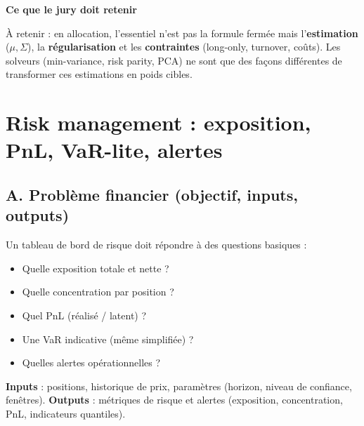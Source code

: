 \documentclass[11pt,a4paper]{report}
\theoremstyle{definition}
\theoremstyle{plain}
\theoremstyle{remark}
\newcommand{\1}{\mathbf{1}}
\newenvironment{jurybox}{
\par\medskip
\begin{lrbox}{\juryboxbox}
\begin{minipage}{0.97\textwidth}
\textbf{Ce que le jury doit retenir}\par\smallskip
\ignorespaces
}{
\unskip\end{minipage}
\end{lrbox}
\noindent\fcolorbox{black!30}{black!3}{\usebox{\juryboxbox}}
\par\medskip
}
\begin{document}

\begin{jurybox}
À retenir : en allocation, l'essentiel n'est pas la formule fermée mais l'\textbf{estimation} ($\mu,\Sigma$), la \textbf{régularisation} et les \textbf{contraintes} (long-only, turnover, coûts). Les solveurs (min-variance, risk parity, PCA) ne sont que des façons différentes de transformer ces estimations en poids cibles.
\end{jurybox}

\chapter{Risk management : exposition, PnL, VaR-lite, alertes}

\section{A. Problème financier (objectif, inputs, outputs)}
Un tableau de bord de risque doit répondre à des questions basiques :
\begin{itemize}[leftmargin=*]
\item Quelle exposition totale et nette ?
\item Quelle concentration par position ?
\item Quel PnL (réalisé / latent) ?
\item Une VaR indicative (même simplifiée) ?
\item Quelles alertes opérationnelles ?
\end{itemize}

\textbf{Inputs} : positions, historique de prix, paramètres (horizon, niveau de confiance, fenêtres).
\textbf{Outputs} : métriques de risque et alertes (exposition, concentration, PnL, indicateurs quantiles).
\end{document}
